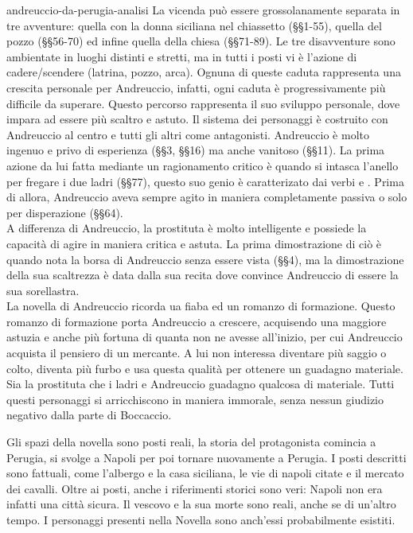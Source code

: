 \documentclass[preview]{standalone}
\begin{document}
\begin{snippet}{andreuccio-da-perugia-analisi}
    La vicenda può essere grossolanamente separata in tre avventure:
    quella con la donna siciliana nel chiassetto (§§1-55), quella del pozzo (§§56-70)
    ed infine quella della chiesa (§§71-89).
    Le tre disavventure sono ambientate in luoghi distinti e stretti,
    ma in tutti i posti vi è l'azione di cadere/scendere (latrina, pozzo, arca).
    Ognuna di queste caduta rappresenta una crescita personale per Andreuccio, infatti,
    ogni caduta è progressivamente più difficile da superare. Questo percorso rappresenta il suo
    sviluppo personale, dove impara ad essere più scaltro e astuto.
    Il sistema dei personaggi è costruito con Andreuccio al centro e tutti gli altri come antagonisti.
    Andreuccio è molto ingenuo e privo di esperienza (§§3, §§16) ma anche vanitoso (§§11).
    La prima azione da lui fatta mediante un ragionamento critico è quando si intasca l'anello per fregare i due ladri (§§77),
    questo suo genio è caratterizato dai verbi  e .
    Prima di allora, Andreuccio aveva sempre agito in maniera completamente passiva o solo per disperazione (§§64).
    \\
    A differenza di Andreuccio, la prostituta è molto intelligente e possiede la capacità di agire in maniera critica e astuta.
    La prima dimostrazione di ciò è quando nota la borsa di Andreuccio senza essere vista (§§4),
    ma la dimostrazione della sua scaltrezza è data dalla sua recita dove convince Andreuccio di essere la sua sorellastra.
    \\
    La novella di Andreuccio ricorda ua fiaba ed un romanzo di formazione.
    Questo romanzo di formazione porta Andreuccio a crescere, acquisendo una maggiore astuzia e anche più fortuna di
    quanta non ne avesse all'inizio, per cui Andreuccio acquista il pensiero di un mercante.
    A lui non interessa diventare più saggio o colto, diventa più furbo e usa questa qualità per ottenere un guadagno materiale.
    Sia la prostituta che i ladri e Andreuccio guadagno qualcosa di materiale.
    Tutti questi personaggi si arricchiscono in maniera immorale, senza nessun giudizio negativo dalla parte di Boccaccio.
    
    Gli spazi della novella sono posti reali, la storia del protagonista comincia a Perugia,
    si svolge a Napoli per poi tornare nuovamente a Perugia.
    I posti descritti sono fattuali, come l'albergo e la casa siciliana, le vie di napoli citate
    e il mercato dei cavalli.
    Oltre ai posti, anche i riferimenti storici sono veri: Napoli non era infatti una città sicura.
    Il vescovo e la sua morte sono reali, anche se di un'altro tempo. I personaggi presenti nella Novella
    sono anch'essi probabilmente esistiti.
\end{snippet}
\end{document}
